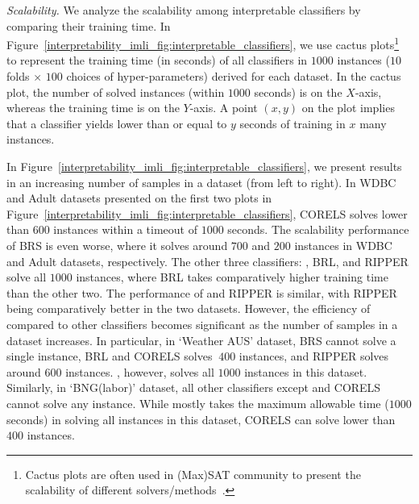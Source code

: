 \textit{Scalability.} We analyze the scalability among interpretable classifiers by comparing their training time. In Figure~\ref{interpretability_imli_fig:interpretable_classifiers}, we use cactus plots\footnote{Cactus plots are often used in (Max)SAT community to present the scalability of different solvers/methods~\cite{argelich2008first,balyo2017sat}.} to represent the training time (in seconds) of all classifiers in $ 1000 $ instances ($ 10 $ folds $ \times  $ $ 100 $ choices of hyper-parameters) derived for each dataset. In the cactus plot, the number of solved instances (within $ 1000 $ seconds) is on the $ X $-axis, whereas the training time is  on the $ Y $-axis. A point $ (x,y) $ on the plot implies that a classifier yields lower than or equal to $ y $ seconds of training in $ x $ many instances. 


In Figure~\ref{interpretability_imli_fig:interpretable_classifiers}, we present results in an increasing number of samples in a dataset (from left to right).
In WDBC and Adult datasets presented on the first two plots in Figure~\ref{interpretability_imli_fig:interpretable_classifiers}, CORELS solves lower than $  600 $ instances within a timeout of $ 1000 $ seconds. The scalability performance of BRS is even worse, where it solves around $ 700 $ and $ 200 $ instances in WDBC and Adult datasets, respectively. The other three classifiers: {\imli}, BRL, and RIPPER  solve all $ 1000 $ instances, where BRL takes comparatively higher training time than the other two. The performance of {\imli} and RIPPER is similar, with RIPPER being comparatively better in the two datasets. However, the efficiency of {\imli} compared to other classifiers becomes significant as the number of samples in a dataset increases. In particular, in `Weather AUS' dataset, BRS cannot solve a single instance, BRL and CORELS solves $ ~400 $ instances, and RIPPER solves around $ 600 $ instances. {\imli}, however, solves all $ 1000 $ instances in this dataset. Similarly, in `BNG(labor)' dataset, all other classifiers except {\imli} and CORELS cannot solve any instance. While {\imli} mostly takes the maximum allowable time ($ 1000 $ seconds) in solving all instances in this dataset, CORELS can solve lower than $ 400 $ instances. 


